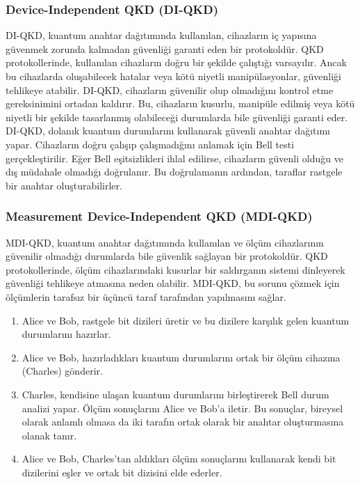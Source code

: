 \newpage

\subsubsection{Device-Independent QKD (DI-QKD)}

DI-QKD, kuantum anahtar dağıtımında kullanılan, cihazların iç yapısına güvenmek zorunda kalmadan güvenliği garanti eden bir protokoldür. QKD protokollerinde, kullanılan cihazların doğru bir şekilde çalıştığı varsayılır. Ancak bu cihazlarda oluşabilecek hatalar veya kötü niyetli manipülasyonlar, güvenliği tehlikeye atabilir. DI-QKD, cihazların güvenilir olup olmadığını kontrol etme gereksinimini ortadan kaldırır. Bu, cihazların kusurlu, manipüle edilmiş veya kötü niyetli bir şekilde tasarlanmış olabileceği durumlarda bile güvenliği garanti eder. DI-QKD, dolanık kuantum durumlarını kullanarak güvenli anahtar dağıtımı yapar. Cihazların doğru çalışıp çalışmadığını anlamak için Bell testi gerçekleştirilir. Eğer Bell eşitsizlikleri ihlal edilirse, cihazların güvenli olduğu ve dış müdahale olmadığı doğrulanır. Bu doğrulamanın ardından, taraflar rastgele bir anahtar oluşturabilirler.

\newpage

\subsubsection{Measurement Device-Independent QKD (MDI-QKD)}

MDI-QKD, kuantum anahtar dağıtımında kullanılan ve ölçüm cihazlarının güvenilir olmadığı durumlarda bile güvenlik sağlayan bir protokoldür. QKD protokollerinde, ölçüm cihazlarındaki kusurlar bir saldırganın sistemi dinleyerek güvenliği tehlikeye atmasına neden olabilir. MDI-QKD, bu sorunu çözmek için ölçümlerin tarafsız bir üçüncü taraf tarafından yapılmasını sağlar.

\begin{enumerate}
    \item Alice ve Bob, rastgele bit dizileri üretir ve bu dizilere karşılık gelen kuantum durumlarını hazırlar.
    \item Alice ve Bob, hazırladıkları kuantum durumlarını ortak bir ölçüm cihazına (Charles) gönderir.
    \item Charles, kendisine ulaşan kuantum durumlarını birleştirerek Bell durum analizi yapar. Ölçüm sonuçlarını Alice ve Bob'a iletir. Bu sonuçlar, bireysel olarak anlamlı olmasa da iki tarafın ortak olarak bir anahtar oluşturmasına olanak tanır.
    \item Alice ve Bob, Charles'tan aldıkları ölçüm sonuçlarını kullanarak kendi bit dizilerini eşler ve ortak bit dizisini elde ederler.
\end{enumerate}

